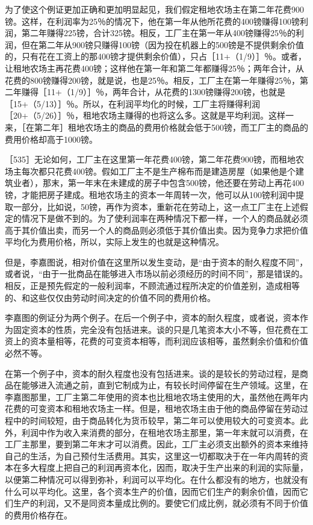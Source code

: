为了使这个例证更加正确和更加明显起见，我们假定租地农场主在第二年花费900镑。这样，在利润率为25％的情况下，他在第一年从他所花费的400镑赚得100镑利润，第二年赚得225镑，合计325镑。相反，工厂主在第一年从400镑赚得25％的利润，但在第二年从900镑只赚得100镑（因为投在机器上的500镑是不提供剩余价值的，只有花在工资上的那400镑才提供剩余价值），只占［11+（1/9）］％。或者，让租地农场主再花费400镑；这样他在第一年和第二年都赚得25％；两年合计，从花费的800镑赚得200镑，就是说，也是25％。相反，工厂主在第一年赚得25％，第二年赚得［11+（1/9）］％，两年合计，从花费的1300镑赚得200镑，也就是［15+（5/13）］％。所以，在利润平均化的时候，工厂主将赚得利润［20+（5/26）］％，租地农场主赚得的也将这么多。这就是平均利润。这样一来，［在第二年］租地农场主的商品的费用价格就会低于500镑，而工厂主的商品的费用价格却高于1000镑。

［535］无论如何，工厂主在这里第一年花费400镑，第二年花费900镑，而租地农场主每次都只花费400镑。假如工厂主不是生产棉布而是建造房屋（如果他是个建筑业者），那末，第一年末在未建成的房子中包含500镑，他还要在劳动上再花400镑，才能把房子建成。租地农场主的资本一年周转一次，他可以从100镑利润中提取一部分，比如说，50镑，再作为资本，重新花在劳动上，这一点工厂主在上述假定的情况下是做不到的。为了使利润率在两种情况下都一样，一个人的商品就必须高于其价值出卖，而另一个人的商品则必须低于其价值出卖。因为竞争力求把价值平均化为费用价格，所以，实际上发生的也就是这种情况。

但是，李嘉图说，相对价值在这里所以发生变动，是“由于资本的耐久程度不同”，或者说，“由于一批商品在能够进入市场以前必须经历的时间不同”，那是错误的。相反，正是预先假定的一般利润率，不顾流通过程所决定的价值差别，造成相等的、和这些仅仅由劳动时间决定的价值不同的费用价格。

李嘉图的例证分为两个例子。在后一个例子中，资本的耐久程度，或者说，资本作为固定资本的性质，完全没有包括进来。谈的只是几笔资本大小不等，但花费在工资上的资本量相等，花费的可变资本相等，而利润应该相等，虽然剩余价值和价值必然不等。

在第一个例子中，资本的耐久程度也没有包括进来。谈的是较长的劳动过程，是商品在能够进入流通之前，直到它制成为止，有较长时间停留在生产领域。这里，在李嘉图那里，工厂主第二年使用的资本也比租地农场主使用的大，虽然他在两年内花费的可变资本和租地农场主一样。但是，租地农场主由于他的商品停留在劳动过程中的时间较短，由于商品转化为货币较早，第二年可以使用较大的可变资本。此外，利润中作为收入来消费的部分，在租地农场主那里，第一年末就可以消费，在工厂主那里，要到第二年末才可以消费。因此，工厂主必须支出额外的资本来维持自己的生活，为自己预付生活费用。其实，这里这一切都取决于在一年内周转的资本在多大程度上把自己的利润再资本化，因而，取决于生产出来的利润的实际量，以便第二种情况可以得到弥补，利润可以平均化。在什么都没有的地方，也就没有什么可以平均化。这里，各个资本生产的价值，因而它们生产的剩余价值，因而它们生产的利润，又不是同资本量成比例的。要使它们成比例，就必须有不同于价值的费用价格存在。

